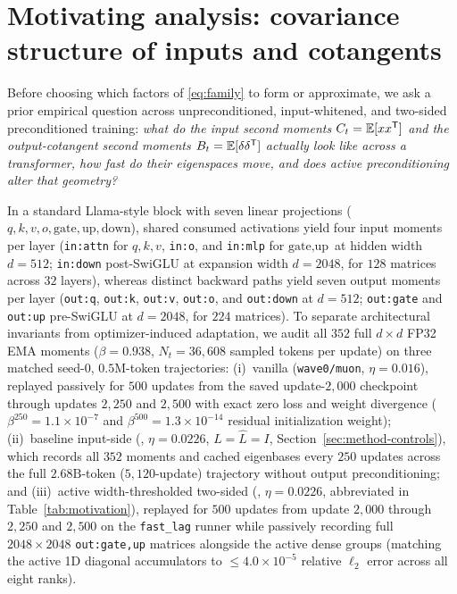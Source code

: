 \section{Motivating analysis: covariance structure of inputs and cotangents}
\label{sec:motivation}

Before choosing which factors of \eqref{eq:family} to form or approximate, we
ask a prior empirical question across unpreconditioned, input-whitened, and
two-sided preconditioned training: \emph{what do the input second moments
$C_t=\mathbb E[xx^{{\mathsf T}}]$ and the output-cotangent second moments
$B_t=\mathbb E[\delta\delta^{{\mathsf T}}]$ actually look like across a transformer, how
fast do their eigenspaces move, and does active preconditioning alter that
geometry?}

In a standard Llama-style block with seven linear projections
($q,k,v,o,\text{gate},\text{up},\text{down}$), shared consumed activations yield
four input moments per layer (\texttt{in:attn} for $q,k,v$, \texttt{in:o}, and
\texttt{in:mlp} for $\text{gate},\text{up}$ at hidden width $d=512$;
\texttt{in:down} post-SwiGLU at expansion width $d=2048$, for $128$ matrices
across $32$ layers), whereas distinct backward paths yield seven output moments
per layer (\texttt{out:q}, \texttt{out:k}, \texttt{out:v}, \texttt{out:o}, and
\texttt{out:down} at $d=512$; \texttt{out:gate} and \texttt{out:up} pre-SwiGLU
at $d=2048$, for $224$ matrices). To separate architectural invariants from
optimizer-induced adaptation, we audit all $352$ full $d\times d$ FP32 EMA
moments ($\beta=0.938$, $N_t=36{,}608$ sampled tokens per update) on three
matched seed-$0$, $0.5\text{M}$-token trajectories: (i)~vanilla 
(\texttt{wave0/muon}, $\eta=0.016$), replayed passively for $500$ updates from
the saved update-$2{,}000$ checkpoint through updates $2{,}250$ and $2{,}500$
with exact zero loss and weight divergence ($\beta^{250}=1.1\times 10^{-7}$ and
$\beta^{500}=1.3\times 10^{-14}$ residual initialization weight); (ii)~baseline
input-side  (\nullall{}, $\eta=0.0226$, $L=\hat L=I$,
Section~\ref{sec:method-controls}), which records all $352$ moments and cached
eigenbases every $250$ updates across the full $2.68\text{B}$-token
($5{,}120$-update) trajectory without output preconditioning; and (iii)~active
width-thresholded two-sided  (\mlpdiaglag{}, $\eta=0.0226$,
abbreviated  in Table~\ref{tab:motivation}), replayed for $500$
updates from update $2{,}000$ through $2{,}250$ and $2{,}500$ on the
\texttt{fast\_lag} runner while passively recording full $2048\times 2048$
\texttt{out:gate,up} matrices alongside the active dense groups (matching the
active 1D diagonal accumulators to $\le 4.0\times 10^{-5}$ relative $\ell_2$
error across all eight ranks).

